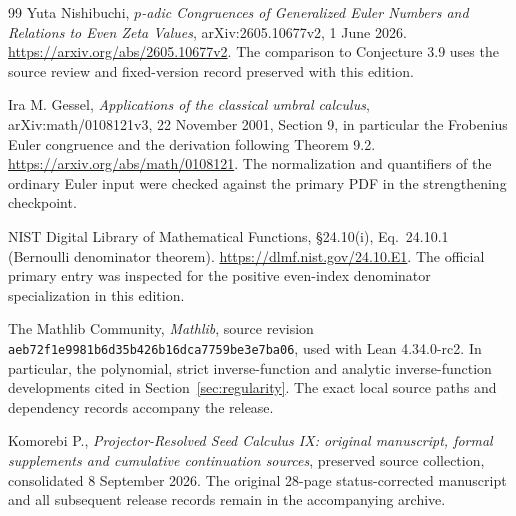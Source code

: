 \documentclass[11pt]{article}
\theoremstyle{definition}
\theoremstyle{remark}
\numberwithin{equation}{section}
\begin{document}
\clearpage
\appendix





\clearpage
\begin{thebibliography}{99}
Yuta Nishibuchi,
\emph{$p$-adic Congruences of Generalized Euler Numbers and Relations to Even
Zeta Values}, arXiv:2605.10677v2, 1 June 2026.
\url{https://arxiv.org/abs/2605.10677v2}.
The comparison to Conjecture 3.9 uses the source review and fixed-version
record preserved with this edition.

Ira M. Gessel, \emph{Applications of the classical umbral calculus},
arXiv:math/0108121v3, 22 November 2001, Section 9, in particular the Frobenius Euler congruence and the derivation following Theorem 9.2.
\url{https://arxiv.org/abs/math/0108121}.
The normalization and quantifiers of the ordinary Euler input were checked against the primary PDF in the strengthening checkpoint.

NIST Digital Library of Mathematical Functions, \S24.10(i),
Eq.\ 24.10.1 (Bernoulli denominator theorem).
\url{https://dlmf.nist.gov/24.10.E1}. The official primary entry was inspected
for the positive even-index denominator specialization in this edition.

The Mathlib Community,
\emph{Mathlib}, source revision
\nolinkurl{aeb72f1e9981b6d35b426b16dca7759be3e7ba06},
used with Lean 4.34.0-rc2.
In particular, the polynomial, strict inverse-function and analytic
inverse-function developments cited in Section~\ref{sec:regularity}.
The exact local source paths and dependency records accompany the release.

Komorebi P.,
\emph{Projector-Resolved Seed Calculus IX: original manuscript, formal
supplements and cumulative continuation sources}, preserved source collection,
consolidated 8 September 2026.
The original 28-page status-corrected manuscript and all subsequent release
records remain in the accompanying archive.


\end{thebibliography}
\end{document}
